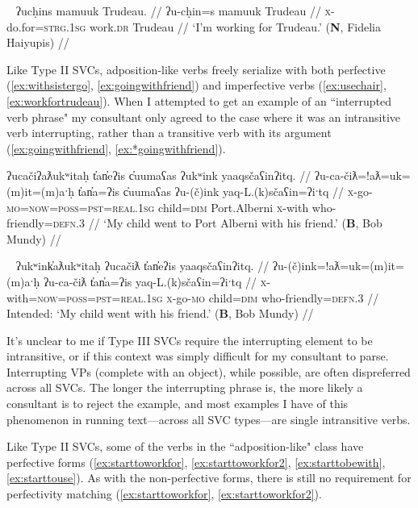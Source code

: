 \ex~ \label{ex:workfortrudeau}
\begingl
\glpreamble ʔucḥins mamuuk Trudeau. //
\gla ʔu-cḥin=s mamuuk Trudeau //
\glb \textsc{x}-do.for=\textsc{strg.1sg} work.\textsc{dr} Trudeau //
\glft `I'm working for Trudeau.' (\textbf{N}, Fidelia Haiyupis) //
\endgl
\xe

Like Type II SVCs, adposition-like verbs freely serialize with both perfective (\ref{ex:withsistergo}, \ref{ex:goingwithfriend}) and imperfective verbs (\ref{ex:usechair}, \ref{ex:workfortrudeau}). When I attempted to get an example of an ``interrupted verb phrase" my consultant only agreed to the case where it was an intransitive verb interrupting, rather than a transitive verb with its argument (\ref{ex:goingwithfriend}, \ref{ex:*goingwithfriend}).

\ex \label{ex:goingwithfriend}
\begingl
\glpreamble ʔucačiʔaƛukʷitaḥ t̓an̓eʔis c̓uumaʕas ʔukʷink yaaqsčaʕinʔitq. //
\gla ʔu-ca-čiƛ=!aƛ=uk=(m)it=(m)aˑḥ t̓an̓a=ʔis c̓uumaʕas ʔu-(č)ink yaq-L.(k)sčaʕin=ʔiˑtq //
\glb \textsc{x}-go-\textsc{mo}=\textsc{now}=\textsc{poss}=\textsc{pst}=\textsc{real.1sg} child=\textsc{dim} Port.Alberni \textsc{x}-with who-friendly=\textsc{defn.3} //
\glft `My child went to Port Alberni with his friend.' (\textbf{B}, Bob Mundy) //
\endgl
\xe

\ex~ \label{ex:*goingwithfriend}
\begingl
\glpreamble *ʔukʷink̓aƛukʷitaḥ ʔucačiƛ t̓an̓eʔis yaaqsčaʕinʔitq. //
\gla ʔu-(č)ink=!aƛ=uk=(m)it=(m)aˑḥ ʔu-ca-čiƛ t̓an̓a=ʔis yaq-L.(k)sčaʕin=ʔiˑtq //
\glb \textsc{x}-with=\textsc{now}=\textsc{poss}=\textsc{pst}=\textsc{real.1sg} \textsc{x}-go-\textsc{mo} child=\textsc{dim} who-friendly=\textsc{defn.3} //
\glft Intended: `My child went with his friend.' (\textbf{B}, Bob Mundy) //
\endgl
\xe

It's unclear to me if Type III SVCs require the interrupting element to be intransitive, or if this context was simply difficult for my consultant to parse. Interrupting VPs (complete with an object), while possible, are often dispreferred across all SVCs. The longer the interrupting phrase is, the more likely a consultant is to reject the example, and most examples I have of this phenomenon in running text---across all SVC types---are single intransitive verbs.


Like Type II SVCs, some of the verbs in the ``adposition-like" class have perfective forms (\ref{ex:starttoworkfor}, \ref{ex:starttoworkfor2}, \ref{ex:starttobewith}, \ref{ex:starttouse}). As with the non-perfective forms, there is still no requirement for perfectivity matching (\ref{ex:starttoworkfor}, \ref{ex:starttoworkfor2}).

